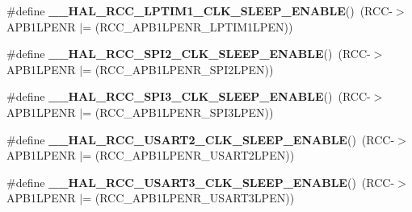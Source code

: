 \begin{DoxyCompactItemize}
\item 
\mbox{\label{group___r_c_c_ex___peripheral___clock___sleep___enable___disable_gae4782a5ec14457be65b7329655014ef7}} 
\#define {\bfseries \+\_\+\+\_\+\+H\+A\+L\+\_\+\+R\+C\+C\+\_\+\+L\+P\+T\+I\+M1\+\_\+\+C\+L\+K\+\_\+\+S\+L\+E\+E\+P\+\_\+\+E\+N\+A\+B\+LE}()~(R\+CC-\/$>$A\+P\+B1\+L\+P\+E\+NR $\vert$= (R\+C\+C\+\_\+\+A\+P\+B1\+L\+P\+E\+N\+R\+\_\+\+L\+P\+T\+I\+M1\+L\+P\+EN))
\item 
\mbox{\label{group___r_c_c_ex___peripheral___clock___sleep___enable___disable_ga8a281ca72aff1c9fa87755c3854cc316}} 
\#define {\bfseries \+\_\+\+\_\+\+H\+A\+L\+\_\+\+R\+C\+C\+\_\+\+S\+P\+I2\+\_\+\+C\+L\+K\+\_\+\+S\+L\+E\+E\+P\+\_\+\+E\+N\+A\+B\+LE}()~(R\+CC-\/$>$A\+P\+B1\+L\+P\+E\+NR $\vert$= (R\+C\+C\+\_\+\+A\+P\+B1\+L\+P\+E\+N\+R\+\_\+\+S\+P\+I2\+L\+P\+EN))
\item 
\mbox{\label{group___r_c_c_ex___peripheral___clock___sleep___enable___disable_gae6fb9249362d38de5191ea0bf8bb1922}} 
\#define {\bfseries \+\_\+\+\_\+\+H\+A\+L\+\_\+\+R\+C\+C\+\_\+\+S\+P\+I3\+\_\+\+C\+L\+K\+\_\+\+S\+L\+E\+E\+P\+\_\+\+E\+N\+A\+B\+LE}()~(R\+CC-\/$>$A\+P\+B1\+L\+P\+E\+NR $\vert$= (R\+C\+C\+\_\+\+A\+P\+B1\+L\+P\+E\+N\+R\+\_\+\+S\+P\+I3\+L\+P\+EN))
\item 
\mbox{\label{group___r_c_c_ex___peripheral___clock___sleep___enable___disable_ga12132da4a7f5c62f32cd9d91b1c99495}} 
\#define {\bfseries \+\_\+\+\_\+\+H\+A\+L\+\_\+\+R\+C\+C\+\_\+\+U\+S\+A\+R\+T2\+\_\+\+C\+L\+K\+\_\+\+S\+L\+E\+E\+P\+\_\+\+E\+N\+A\+B\+LE}()~(R\+CC-\/$>$A\+P\+B1\+L\+P\+E\+NR $\vert$= (R\+C\+C\+\_\+\+A\+P\+B1\+L\+P\+E\+N\+R\+\_\+\+U\+S\+A\+R\+T2\+L\+P\+EN))
\item 
\mbox{\label{group___r_c_c_ex___peripheral___clock___sleep___enable___disable_ga2a18798b0e216c3ccc3caa76e741a689}} 
\#define {\bfseries \+\_\+\+\_\+\+H\+A\+L\+\_\+\+R\+C\+C\+\_\+\+U\+S\+A\+R\+T3\+\_\+\+C\+L\+K\+\_\+\+S\+L\+E\+E\+P\+\_\+\+E\+N\+A\+B\+LE}()~(R\+CC-\/$>$A\+P\+B1\+L\+P\+E\+NR $\vert$= (R\+C\+C\+\_\+\+A\+P\+B1\+L\+P\+E\+N\+R\+\_\+\+U\+S\+A\+R\+T3\+L\+P\+EN))

\end{DoxyCompactItemize}
